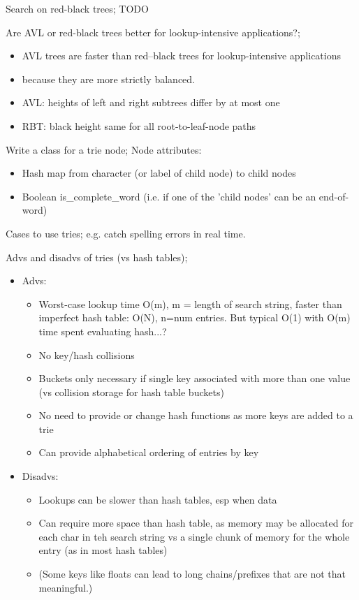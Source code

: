 \documentclass{article}
\begin{document}
Search on red-black trees; TODO

Are AVL or red-black trees better for lookup-intensive applications?; \begin{itemize} \item AVL trees are faster than red–black trees for lookup-intensive applications \item because they are more strictly balanced.  \item AVL: heights of left and right subtrees differ by at most one \item RBT: black height same for all root-to-leaf-node paths \end{itemize}

Write a class for a trie node; Node attributes: \begin{itemize} \item Hash map from character (or label of child node) to child nodes \item Boolean is\_complete\_word (i.e. if one of the 'child nodes' can be an end-of-word) \end{itemize}

Cases to use tries; e.g. catch spelling errors in real time.

Advs and disadvs of tries (vs hash tables); \begin{itemize} \item Advs: \begin{itemize} \item Worst-case lookup time O(m), m = length of search string, faster than imperfect hash table: O(N), n=num entries. But typical O(1) with O(m) time spent evaluating hash...?  \item No key/hash collisions \item Buckets only necessary if single key associated with more than one value (vs collision storage for hash table buckets) \item No need to provide or change hash functions as more keys are added to a trie \item Can provide alphabetical ordering of entries by key \end{itemize} \item Disadvs: \begin{itemize} \item Lookups can be slower than hash tables, esp when data \item Can require more space than hash table, as memory may be allocated for each char in teh search string vs a single chunk of memory for the whole entry (as in most hash tables) \item (Some keys like floats can lead to long chains/prefixes that are not that meaningful.) \end{itemize} \end{itemize}
\end{document}
